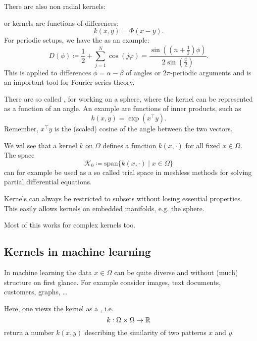 \begin{remark}
    There are also non radial kernels:
    
     or  
    kernels are functions of differences:
    \[k(x,y)=\Phi(x-y).\]
    For periodic setups, we have the  as an example:
    \[D(\phi)\coloneqq \frac{1}{2}+\sum_{j=1}^N\cos(j\varphi)=\frac{\sin\left(\left(n+\frac{1}{2}\right)\phi\right)}{2\sin\left(\frac{\phi}{2}\right)}.\]
    This is applied to differences $\phi=\alpha-\beta$ of angles or $2\pi$-periodic arguments and is an important tool for Fourier series theory.

    There are so called , for working on a sphere, where the kernel 
    can be represented as a function of an angle. An example are functions of inner products, such as 
    \[k(x,y)=\exp(x^\intercal y).\]
    Remember, $x^\intercal y$ is the (scaled) cosine of the angle between the two vectors.
\end{remark}

\begin{remark}
    We wil see that a kernel $k$ on $\Omega$ defines a function $k(x,\cdot)$ for all fixed $x\in\Omega$. The space
    \[\mathcal{K}_0\coloneqq \text{span}\{k(x,\cdot)\mid x\in\Omega\}\]
    can for example be used as a so called trial space in meshless methods for solving partial differential equations.
\end{remark}
\begin{remark}
    Kernels can always be restricted to subsets without losing essential properties.
    This easily allows kernels on embedded manifolds, e.g. the sphere.
\end{remark}
\begin{remark}
    Most of this works for complex kernels too.
\end{remark}

\subsection{Kernels in machine learning}

In machine learning the data $x\in\Omega$ can be quite diverse and without (much)
structure on first glance. For example consider images, text documents, customers, graphs, \dots

Here, one views the kernel as a , i.e.
\[k:\Omega\times \Omega\to\mathbb{R}\]
return a number $k(x,y)$ describing the similarity of two patterns $x$ and $y$.

